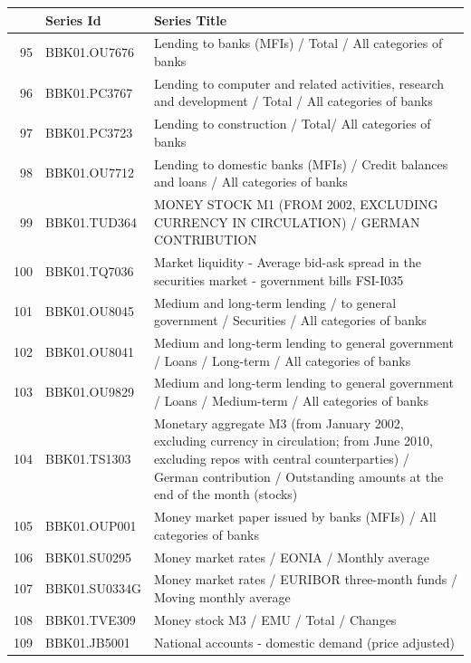 \documentclass[11pt]{article}
\begin{document}
\begin{table}
\centering
\begin{tabular}{rp{5cm}p{11cm}}
& \textbf{Series Id} & \textbf{Series Title} \\
  \hline
  \hline
  95 & BBK01.OU7676 & Lending to banks (MFIs) / Total / All categories of banks \\ 
  \hline
  96 & BBK01.PC3767 & Lending to computer and related activities, research and development / Total / All categories of banks \\ 
  \hline
  97 & BBK01.PC3723 & Lending to construction / Total/ All categories of banks \\ 
  \hline
  98 & BBK01.OU7712 & Lending to domestic banks (MFIs) / Credit balances and loans / All categories of banks \\ 
  \hline
  99 & BBK01.TUD364 & MONEY STOCK M1 (FROM 2002, EXCLUDING CURRENCY IN CIRCULATION) / GERMAN CONTRIBUTION \\ 
  \hline
  100 & BBK01.TQ7036 & Market liquidity - Average bid-ask spread in the securities market - government bills                          FSI-I035 \\ 
  \hline
  101 & BBK01.OU8045 & Medium and long-term lending / to general government / Securities / All categories of banks \\ 
  \hline
  102 & BBK01.OU8041 & Medium and long-term lending to general government / Loans / Long-term / All categories of banks \\ 
  \hline
  103 & BBK01.OU9829 & Medium and long-term lending to general government / Loans / Medium-term / All categories of banks \\ 
  \hline
  104 & BBK01.TS1303 & Monetary aggregate M3 (from January 2002, excluding currency in circulation; from June 2010, excluding repos with central counterparties) / German contribution / Outstanding amounts at the end of the month (stocks) \\ 
  \hline
  105 & BBK01.OUP001 & Money market paper issued by banks (MFIs) / All categories of banks \\ 
  \hline
  106 & BBK01.SU0295 & Money market rates / EONIA / Monthly average \\ 
  \hline
  107 & BBK01.SU0334G & Money market rates / EURIBOR three-month funds / Moving monthly average \\ 
  \hline
  108 & BBK01.TVE309 & Money stock M3 / EMU / Total / Changes \\ 
  \hline
  109 & BBK01.JB5001 & National accounts - domestic demand (price adjusted) \\ 

\end{tabular}
\end{table}
\end{document}
